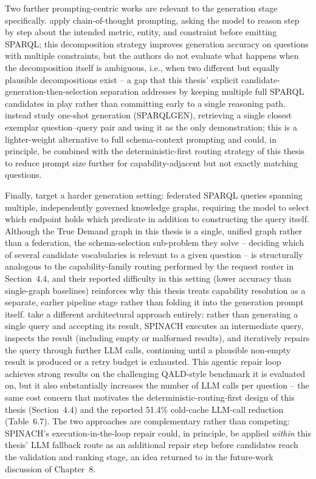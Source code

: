\documentclass[
  12pt,
  english,
  oneside]{report}
\begin{document}
Two further prompting-centric works are relevant to the generation stage
specifically. \citet{zahera2024generating} apply chain-of-thought
prompting, asking the model to reason step by step about the intended
metric, entity, and constraint before emitting SPARQL; this decomposition
strategy improves generation accuracy on questions with multiple
constraints, but the authors do not evaluate what happens when the
decomposition itself is ambiguous, i.e., when two different but equally
plausible decompositions exist -- a gap that this thesis' explicit
candidate-generation-then-selection separation addresses by keeping
multiple full SPARQL candidates in play rather than committing early to a
single reasoning path. \citet{kovriguina2023sparqlgen} instead study
one-shot generation (SPARQLGEN), retrieving a single closest exemplar
question--query pair and using it as the only demonstration; this is a
lighter-weight alternative to full schema-context prompting and could, in
principle, be combined with the deterministic-first routing strategy of
this thesis to reduce prompt size further for capability-adjacent but not
exactly matching questions.

Finally, \citet{emonet2024llm} target a harder generation setting:
federated SPARQL queries spanning multiple, independently governed
knowledge graphs, requiring the model to select which endpoint holds which
predicate in addition to constructing the query itself. Although the True
Demand graph in this thesis is a single, unified graph rather than a
federation, the schema-selection sub-problem they solve -- deciding which
of several candidate vocabularies is relevant to a given question -- is
structurally analogous to the capability-family routing performed by the
request router in Section~4.4, and their reported difficulty in this
setting (lower accuracy than single-graph baselines) reinforces why this
thesis treats capability resolution as a separate, earlier pipeline stage
rather than folding it into the generation prompt itself.
\citet{liu2024spinach} take a different architectural approach entirely:
rather than generating a single query and accepting its result, SPINACH
executes an intermediate query, inspects the result (including empty or
malformed results), and iteratively repairs the query through further LLM
calls, continuing until a plausible non-empty result is produced or a
retry budget is exhausted. This agentic repair loop achieves strong results
on the challenging QALD-style benchmark it is evaluated on, but it also
substantially increases the number of LLM calls per question -- the same
cost concern that motivates the deterministic-routing-first design of this
thesis (Section~4.4) and the reported 51.4\% cold-cache LLM-call reduction
(Table~6.7). The two approaches are complementary rather than competing:
SPINACH's execution-in-the-loop repair could, in principle, be applied
\emph{within} this thesis' LLM fallback route as an additional repair step
before candidates reach the validation and ranking stage, an idea returned
to in the future-work discussion of Chapter~8.
\end{document}

